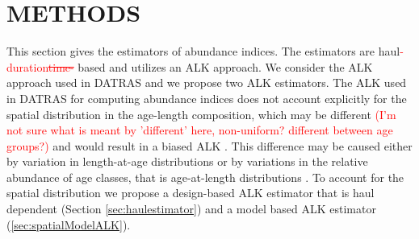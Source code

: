 \documentclass[a4paper 12pt]{article}
\numberwithin{equation}{section}
\newcommand{\ed}[1]{\textcolor{red}{#1}}
\begin{document}
\section{\large METHODS}
\label{sec:methods}
This section gives the estimators of abundance indices. The estimators are haul\ed{-duration\sout{time-}} based and utilizes an ALK approach. We consider the ALK approach used in DATRAS and we propose two ALK estimators. The ALK used in DATRAS for computing abundance indices does not account explicitly for the spatial distribution in the age-length composition, which may be different \ed{(I'm not sure what is meant by 'different' here, non-uniform? different between age groups?)} and would result in a biased ALK \citep{kimura1977statistical}. This difference may be caused either by variation in length-at-age distributions or by variations in the relative abundance of age classes, that is age-at-length distributions \citep{gerritsen2006simple}.  To account for the spatial distribution we propose a design-based ALK estimator that is haul dependent (Section \ref{sec:haulestimator}) and a model based ALK estimator (\ref{sec:spatialModelALK}).
\end{document}
